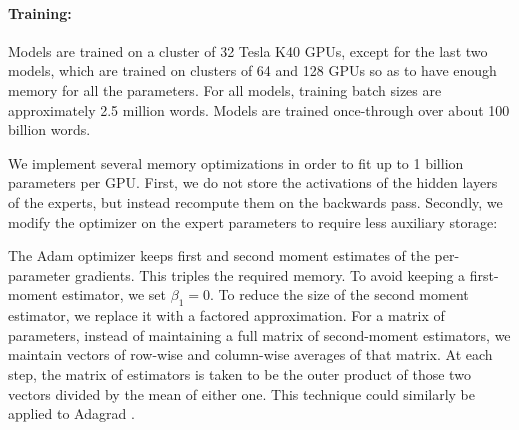 \documentclass{article}
\begin{document}
\paragraph{Training:}  Models are trained on a cluster of 32 Tesla K40 GPUs, except for the last two models, which are trained on clusters of 64 and 128 GPUs so as to have enough memory for all the parameters.   For all models, training batch sizes are approximately 2.5 million words.  Models are trained once-through over about 100 billion words.

We implement several memory optimizations in order to fit up to 1 billion parameters per GPU.   First, we do not store the activations of the hidden layers of the experts, but instead recompute them on the backwards pass.  Secondly, we modify the optimizer on the expert parameters to require less auxiliary storage:

The Adam optimizer \citep{kingma2014adam} keeps first and second moment estimates of the per-parameter gradients.  This triples the required memory.  To avoid keeping a first-moment estimator, we set $\beta_1=0$.  To reduce the size of the second moment estimator, we replace it with a factored approximation.  For a matrix of parameters, instead of maintaining a full matrix of second-moment estimators, we maintain vectors of row-wise and column-wise averages of that matrix.   At each step, the matrix of estimators is taken to be the outer product of those two vectors divided by the mean of either one.   This technique could similarly be applied to Adagrad \citep{duchi10}.
\end{document}
